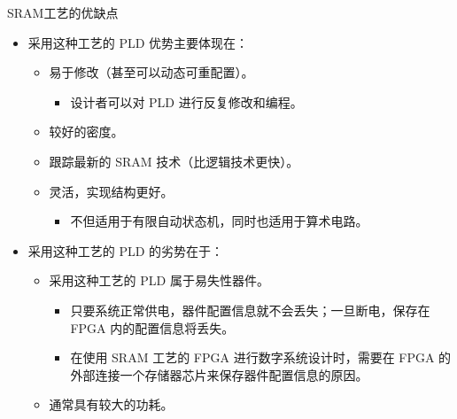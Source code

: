 \begin{frame}{SRAM工艺的优缺点}
\begin{itemize}
\tightlist
\item
    采用这种工艺的 PLD 优势主要体现在：

    \begin{itemize}
    \tightlist
    \item
    易于修改（甚至可以动态可重配置）。

    \begin{itemize}
    \tightlist
    \item
        设计者可以对 PLD 进行反复修改和编程。
    \end{itemize}
    \item
    较好的密度。
    \item
    跟踪最新的 SRAM 技术（比逻辑技术更快）。
    \item
    灵活，实现结构更好。

    \begin{itemize}
    \tightlist
    \item
        不但适用于有限自动状态机，同时也适用于算术电路。
    \end{itemize}
    \end{itemize}
\item
    采用这种工艺的 PLD 的劣势在于：

    \begin{itemize}
    \tightlist
    \item
    采用这种工艺的 PLD 属于易失性器件。

    \begin{itemize}
    \tightlist
    \item
        只要系统正常供电，器件配置信息就不会丢失；一旦断电，保存在 FPGA
        内的配置信息将丢失。
    \item
        在使用 SRAM 工艺的 FPGA 进行数字系统设计时，需要在 FPGA
        的外部连接一个存储器芯片来保存器件配置信息的原因。
    \end{itemize}
    \item
    通常具有较大的功耗。
    \end{itemize}
\end{itemize}
\end{frame}

